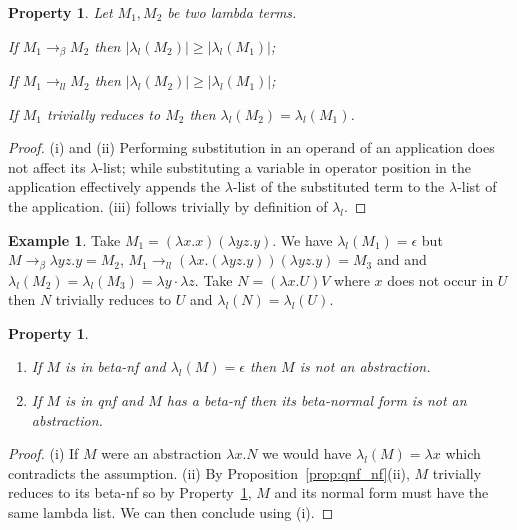 \documentclass{elsarticle}
\theoremstyle{plain}
\newtheorem{property}[theorem]{Property}
\theoremstyle{definition}
\newtheorem{example}{Example}[section]
\newcommand{\llred}{\rightarrow_{ll}}
\begin{document}

\begin{property}
\label{property:lambdalist_linearred}
    Let $M_1, M_2$ be two lambda terms.
    \begin{enumerate*}[noitemsep,label=(\roman*)]
        \item If $M_1 \rightarrow_\beta M_2$ then $|\lambda_l(M_2)| \geq
        |\lambda_l(M_1)|$;
        \item If $M_1 \llred M_2$ then $|\lambda_l(M_2)| \geq
        |\lambda_l(M_1)|$;
        \item If $M_1$ trivially reduces to $M_2$ then $\lambda_l(M_2) =
        \lambda_l(M_1)$.
    \end{enumerate*}
\end{property}
\begin{proof}
    (i) and (ii) Performing substitution in an operand of an application does not affect its $\lambda$-list; while substituting a variable in operator position in the application effectively appends the $\lambda$-list of the substituted term to the $\lambda$-list of the application.
    (iii) follows trivially by definition of $\lambda_l$.
\end{proof}
\begin{example}
Take $M_1 = (\lambda x . x) (\lambda y z . y)$. We have $\lambda_l(M_1) = \epsilon$ but $M \rightarrow_\beta \lambda y z . y = M_2$,
$M_1 \llred (\lambda x . (\lambda y z . y)) (\lambda y z . y) = M_3$ and
and $\lambda_l(M_2) = \lambda_l(M_3) = \lambda y \cdot \lambda z$.
Take $N = (\lambda x . U) V$ where $x$ does not occur in $U$ then $N$ trivially reduces to $U$ and $\lambda_l(N) = \lambda_l(U)$.
\end{example}

\begin{property}
\label{prop:qnf_betanf_empty_lambdalist}
    \begin{enumerate}[noitemsep,label=(\roman*)]
    \item If $M$ is in beta-nf and $\lambda_l(M) = \epsilon$ then $M$ is not an abstraction.
    \item If $M$ is in \emph{qnf} and $M$ has a beta-nf then its beta-normal form is not an abstraction.
    \end{enumerate}
\end{property}
\begin{proof}
(i) If $M$ were an abstraction $\lambda x. N$ we would have $\lambda_l(M) = \lambda x$ which contradicts the assumption.
(ii) By Proposition~\ref{prop:qnf_nf}(ii), $M$ trivially reduces to
its beta-nf so by Property~\ref{property:lambdalist_linearred},
$M$ and its normal form must have the same lambda list. We can then conclude using (i).
\end{proof}
\end{document}

